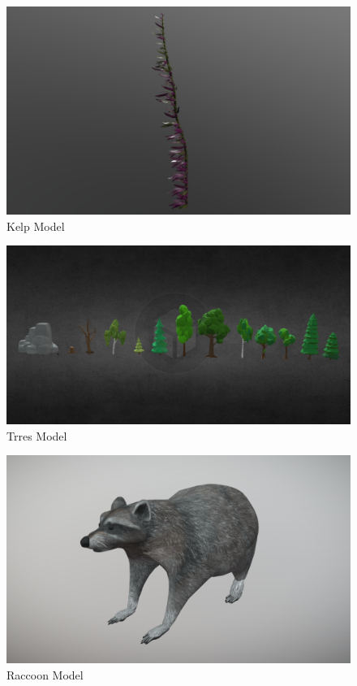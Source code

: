 \documentclass{article}
\begin{document}
    \begin{figure}
        \centering
        \includegraphics[width=\textwidth]{images/models/kelp.png}
        \caption{Kelp Model \cite{model-kelp}} \label{fig:kelp-model}
    \end{figure}
    \begin{figure}
        \centering
        \includegraphics[width=\textwidth]{images/models/trees.png}
        \caption{Trres Model \cite{model-trees}} \label{fig:trees-model}
    \end{figure}
    \begin{figure}
        \centering
        \includegraphics[width=\textwidth]{images/models/raccoon.png}
        \caption{Raccoon Model \cite{model-raccoon}} \label{fig:raccoon-model}
    \end{figure}
\end{document}
